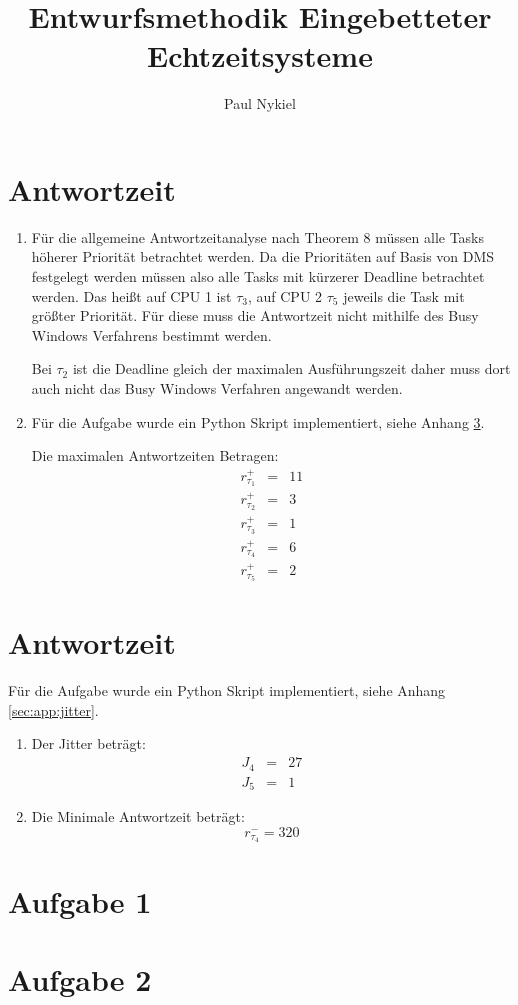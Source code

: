 \documentclass[DIN, pagenumber=false, fontsize=11pt, parskip=half]{scrartcl}
\title{Entwurfsmethodik Eingebetteter Echtzeitsysteme}
\author{Paul Nykiel}
\begin{document}
    \maketitle
    \section{Antwortzeit}
    \begin{enumerate}[label=\alph*)]
        \item Für die allgemeine Antwortzeitanalyse nach Theorem 8 müssen alle Tasks höherer Priorität betrachtet
            werden. Da die Prioritäten auf Basis von DMS festgelegt werden müssen also alle Tasks mit kürzerer Deadline
            betrachtet werden. Das heißt auf CPU 1 ist $\tau_3$, auf CPU 2 $\tau_5$ jeweils die Task mit größter 
            Priorität. Für diese muss die Antwortzeit nicht mithilfe des Busy Windows Verfahrens bestimmt werden.

            Bei $\tau_2$ ist die Deadline gleich der maximalen Ausführungszeit
            daher muss dort auch nicht das Busy Windows Verfahren angewandt werden.
        \item 
            Für die Aufgabe wurde ein Python Skript implementiert, siehe Anhang \ref{app:sec:response}.

            Die maximalen Antwortzeiten Betragen:
            \begin{eqnarray}
                r^+_{\tau_1} &=& 11 \\
                r^+_{\tau_2} &=& 3 \\
                r^+_{\tau_3} &=& 1 \\
                r^+_{\tau_4} &=& 6 \\
                r^+_{\tau_5} &=& 2
            \end{eqnarray}
    \end{enumerate}

    \section{Antwortzeit}
    Für die Aufgabe wurde ein Python Skript implementiert, siehe Anhang \ref{sec:app:jitter}.
    \begin{enumerate}[label=\alph*)]
        \item Der Jitter beträgt:
            \begin{eqnarray}
                J_4 &=& 27 \\
                J_5 &=& 1
            \end{eqnarray}
        \item Die Minimale Antwortzeit beträgt:
            \begin{equation}
                r^-_{\tau_4} = 320
            \end{equation} 
    \end{enumerate}

    \appendix
    \section{Aufgabe 1} \label{app:sec:response}
    

    \section{Aufgabe 2} \label{app:sec:jitter}
    
    
\end{document}
